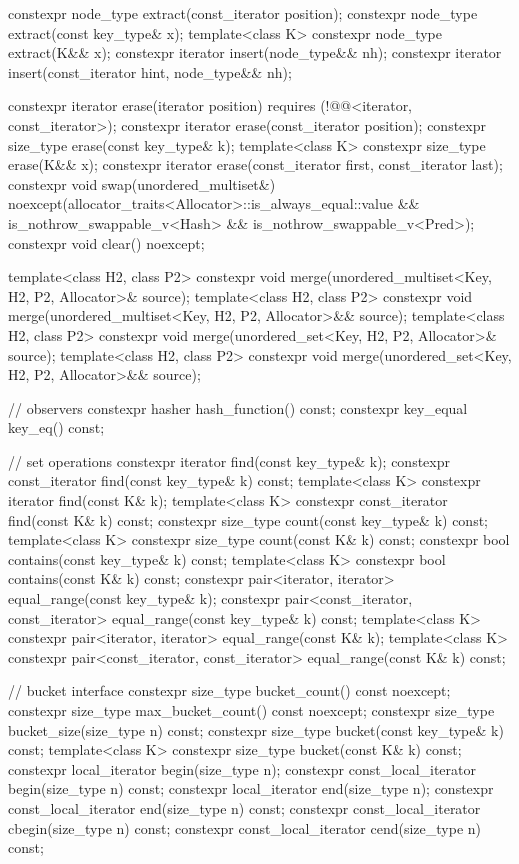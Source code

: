 \begin{codeblock}
{{    constexpr node_type extract(const_iterator position);
    constexpr node_type extract(const key_type& x);
    template<class K> constexpr node_type extract(K&& x);
    constexpr iterator insert(node_type&& nh);
    constexpr iterator insert(const_iterator hint, node_type&& nh);

    constexpr iterator  erase(iterator position)
      requires (!@@<iterator, const_iterator>);
    constexpr iterator  erase(const_iterator position);
    constexpr size_type erase(const key_type& k);
    template<class K> constexpr size_type erase(K&& x);
    constexpr iterator  erase(const_iterator first, const_iterator last);
    constexpr void      swap(unordered_multiset&)
      noexcept(allocator_traits<Allocator>::is_always_equal::value &&
               is_nothrow_swappable_v<Hash> && is_nothrow_swappable_v<Pred>);
    constexpr void      clear() noexcept;

    template<class H2, class P2>
      constexpr void merge(unordered_multiset<Key, H2, P2, Allocator>& source);
    template<class H2, class P2>
      constexpr void merge(unordered_multiset<Key, H2, P2, Allocator>&& source);
    template<class H2, class P2>
      constexpr void merge(unordered_set<Key, H2, P2, Allocator>& source);
    template<class H2, class P2>
      constexpr void merge(unordered_set<Key, H2, P2, Allocator>&& source);

    // observers
    constexpr hasher hash_function() const;
    constexpr key_equal key_eq() const;

    // set operations
    constexpr iterator         find(const key_type& k);
    constexpr const_iterator   find(const key_type& k) const;
    template<class K>
      constexpr iterator       find(const K& k);
    template<class K>
      constexpr const_iterator find(const K& k) const;
    constexpr size_type        count(const key_type& k) const;
    template<class K>
      constexpr size_type      count(const K& k) const;
    constexpr bool             contains(const key_type& k) const;
    template<class K>
      constexpr bool           contains(const K& k) const;
    constexpr pair<iterator, iterator>               equal_range(const key_type& k);
    constexpr pair<const_iterator, const_iterator>   equal_range(const key_type& k) const;
    template<class K>
      constexpr pair<iterator, iterator>             equal_range(const K& k);
    template<class K>
      constexpr pair<const_iterator, const_iterator> equal_range(const K& k) const;

    // bucket interface
    constexpr size_type bucket_count() const noexcept;
    constexpr size_type max_bucket_count() const noexcept;
    constexpr size_type bucket_size(size_type n) const;
    constexpr size_type bucket(const key_type& k) const;
    template<class K> constexpr size_type bucket(const K& k) const;
    constexpr local_iterator begin(size_type n);
    constexpr const_local_iterator begin(size_type n) const;
    constexpr local_iterator end(size_type n);
    constexpr const_local_iterator end(size_type n) const;
    constexpr const_local_iterator cbegin(size_type n) const;
    constexpr const_local_iterator cend(size_type n) const;

}}
\end{codeblock}
